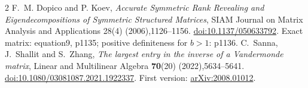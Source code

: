 \documentclass[11pt]{article}
\begin{document}
\begin{thebibliography}{2}
 F.~M. Dopico and P. Koev, \emph{Accurate Symmetric Rank Revealing and Eigendecompositions of Symmetric Structured Matrices}, SIAM Journal on Matrix Analysis and Applications 28(4) (2006),1126--1156. \href{https://doi.org/10.1137/050633792}{doi:10.1137/050633792}. Exact matrix: equation9, p1135; positive definiteness for $b>1$: p1136.
 C.~Sanna, J.~Shallit and S.~Zhang,
\emph{The largest entry in the inverse of a Vandermonde matrix},
Linear and Multilinear Algebra \textbf{70}(20) (2022),5634--5641.
\href{https://doi.org/10.1080/03081087.2021.1922337}{doi:10.1080/03081087.2021.1922337}.
First version: \href{https://arxiv.org/abs/2008.01012}{arXiv:2008.01012}.
\end{thebibliography}
\end{document}
